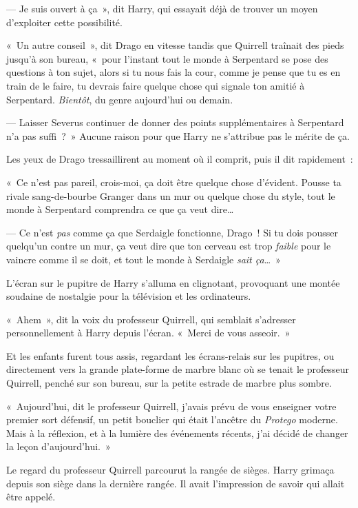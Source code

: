 --- Je suis ouvert à ça~», dit Harry, qui essayait déjà de trouver un moyen d'exploiter cette possibilité.

«~Un autre conseil~», dit Drago en vitesse tandis que Quirrell traînait des pieds jusqu'à son bureau, «~pour l'instant tout le monde à Serpentard se pose des questions à ton sujet, alors si tu nous fais la cour, comme je pense que tu es en train de le faire, tu devrais faire quelque chose qui signale ton amitié à Serpentard.
\emph{Bientôt}, du genre aujourd'hui ou demain.

--- Laisser Severus continuer de donner des points supplémentaires à Serpentard n'a pas suffi~?~»
Aucune raison pour que Harry ne s'attribue pas le mérite de ça.

Les yeux de Drago tressaillirent au moment où il comprit, puis il dit rapidement~:

«~Ce n'est pas pareil, crois-moi, ça doit être quelque chose d'évident.
Pousse ta rivale sang-de-bourbe Granger dans un mur ou quelque chose du style, tout le monde à Serpentard comprendra ce que ça veut dire…

--- Ce n'est \emph{pas} comme ça que Serdaigle fonctionne, Drago~!
Si tu dois pousser quelqu'un contre un mur, ça veut dire que ton cerveau est trop \emph{faible} pour le vaincre comme il se doit, et tout le monde à Serdaigle \emph{sait ça}…~»

L'écran sur le pupitre de Harry s'alluma en clignotant, provoquant une montée soudaine de nostalgie pour la télévision et les ordinateurs.

«~Ahem~», dit la voix du professeur Quirrell, qui semblait s'adresser personnellement à Harry depuis l'écran.
«~Merci de vous asseoir.~»

\later

Et les enfants furent tous assis, regardant les écrans-relais sur les pupitres, ou directement vers la grande plate-forme de marbre blanc où se tenait le professeur Quirrell, penché sur son bureau, sur la petite estrade de marbre plus sombre.

«~Aujourd'hui, dit le professeur Quirrell, j'avais prévu de vous enseigner votre premier sort défensif, un petit bouclier qui était l'ancêtre du \emph{Protego} moderne.
Mais à la réflexion, et à la lumière des événements récents, j'ai décidé de changer la leçon d'aujourd'hui.~»

Le regard du professeur Quirrell parcourut la rangée de sièges.
Harry grimaça depuis son siège dans la dernière rangée.
Il avait l'impression de savoir qui allait être appelé.

